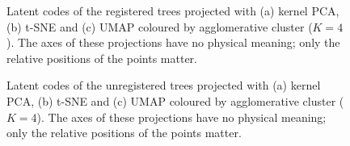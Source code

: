 \begin{figure}[p]                       %
  \centering
  {\small {} \quad {} \quad {} \quad {}}  %
  \par\smallskip
  \par\vspace{3pt}
  \par\vspace{3pt}
  \caption{Latent codes of the registered trees projected with (a) kernel PCA, (b) t-SNE and (c) UMAP coloured by agglomerative cluster ($K=4$). The axes of these projections have no physical meaning; only the relative positions of the points matter.}
  \label{fig:clust_agglo_proj_reg}
\end{figure}

\begin{figure}[p]                       %
  \centering
  {\small {} \quad {} \quad {} \quad {}}  %
  \par\smallskip
  \par\vspace{3pt}
  \par\vspace{3pt}
  \caption{Latent codes of the unregistered trees projected with (a) kernel PCA, (b) t-SNE and (c) UMAP coloured by agglomerative cluster ($K=4$). The axes of these projections have no physical meaning; only the relative positions of the points matter.}
  \label{fig:clust_agglo_proj_unreg}
\end{figure}


